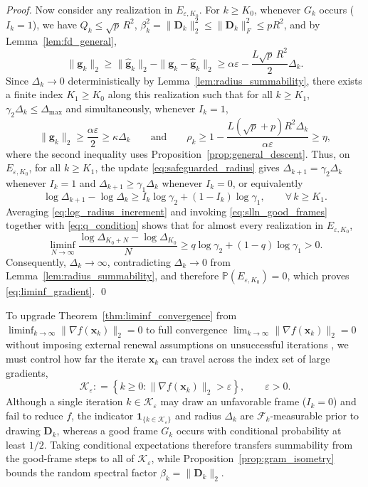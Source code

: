 \documentclass[smallextended]{svjour3}
\newcommand{\bx}{\bm{x}}
\newcommand{\bg}{\bm{g}}
\providecommand{\coloneqq}{\mathrel{\mathop:}=}
\begin{document}
\begin{proof}
Now consider any realization in $E_{\varepsilon, K_0}$. For $k \ge K_0$, whenever $G_k$ occurs ($I_k = 1$), we have $Q_k\le\sqrt p\,R^2$, $\beta_k^2 = \|\bm D_k\|_2^2 \le \|\bm D_k\|_F^2 \le pR^2$, and by Lemma~\ref{lem:fd_general},
\[
\|\bg_k\|_2 \ge \|\hat{\bg}_k\|_2 - \|\bg_k-\hat{\bg}_k\|_2 \ge \alpha\varepsilon - \frac{L\sqrt p\,R^2}{2}\Delta_k.
\]
Since $\Delta_k\to0$ deterministically by Lemma~\ref{lem:radius_summability}, there exists a finite index $K_1 \ge K_0$ along this realization such that for all $k \ge K_1$, $\gamma_2\Delta_k \le \Delta_{\max}$ and simultaneously, whenever $I_k = 1$,
\[
\|\bg_k\|_2 \ge \frac{\alpha\varepsilon}{2} \ge \kappa\Delta_k \qquad \text{and} \qquad \rho_k \ge 1 - \frac{L(\sqrt p + p)R^2\Delta_k}{\alpha\varepsilon} \ge \eta,
\]
where the second inequality uses Proposition~\ref{prop:general_descent}. Thus, on $E_{\varepsilon, K_0}$, for all $k \ge K_1$, the update \eqref{eq:safeguarded_radius} gives $\Delta_{k+1} = \gamma_2\Delta_k$ whenever $I_k = 1$ and $\Delta_{k+1} \ge \gamma_1\Delta_k$ whenever $I_k = 0$, or equivalently
\begin{equation}
\label{eq:log_radius_increment}
\log\Delta_{k+1}-\log\Delta_k \ge I_k\log\gamma_2 + (1-I_k)\log\gamma_1, \qquad \forall\, k \ge K_1.
\end{equation}
Averaging \eqref{eq:log_radius_increment} and invoking \eqref{eq:slln_good_frames} together with \eqref{eq:q_condition} shows that for almost every realization in $E_{\varepsilon, K_0}$,
\[
\liminf_{N\to\infty} \frac{\log\Delta_{K_0+N}-\log\Delta_{K_0}}{N} \ge q\log\gamma_2 + (1-q)\log\gamma_1 > 0.
\]
Consequently, $\Delta_k \to \infty$, contradicting $\Delta_k\to0$ from Lemma~\ref{lem:radius_summability}, and therefore $\mathbb P(E_{\varepsilon, K_0}) = 0$, which proves \eqref{eq:liminf_gradient}.
\qed
\end{proof}

To upgrade Theorem~\ref{thm:liminf_convergence} from $\liminf_{k\to\infty}\|\nabla f(\bx_k)\|_2 = 0$ to full convergence $\lim_{k\to\infty}\|\nabla f(\bx_k)\|_2 = 0$ without imposing external renewal assumptions on unsuccessful iterations \cite{bandeira2014convergence,Gratton-2017}, we must control how far the iterate $\bx_k$ can travel across the index set of large gradients,
\[
\mathcal K_\varepsilon \coloneqq \left\{ k \ge 0 : \|\nabla f(\bx_k)\|_2 > \varepsilon \right\}, \qquad \varepsilon > 0.
\]
Although a single iteration $k \in \mathcal K_\varepsilon$ may draw an unfavorable frame ($I_k = 0$) and fail to reduce $f$, the indicator $\mathbf{1}_{\{k\in\mathcal K_\varepsilon\}}$ and radius $\Delta_k$ are $\mathcal F_k$-measurable prior to drawing $\bm D_k$, whereas a good frame $G_k$ occurs with conditional probability at least $1/2$. Taking conditional expectations therefore transfers summability from the good-frame steps to all of $\mathcal K_\varepsilon$, while Proposition~\ref{prop:gram_isometry} bounds the random spectral factor $\beta_k = \|\bm D_k\|_2$.
\end{document}
